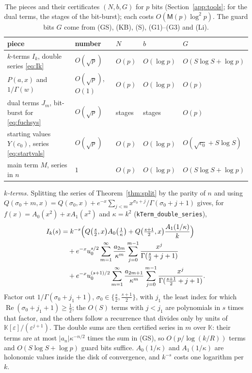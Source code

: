 \documentclass[11pt,reqno]{amsart}
\theoremstyle{definition}
\theoremstyle{remark}
\newcommand{\Mul}{\mathsf{M}}
\begin{document}
\begin{small}
\begin{table}[ht]
\centering\footnotesize
\caption{The pieces and their certificates $(N, b, G)$ for $p$ bits (Section~\ref{app:tools}; for the dual terms, the stages of the bit-burst); each costs $O(\Mul(p)\log^2p)$. The guard bits $G$ come from (GS), (KB), (S), (G1)--(G3) and (Li).}
\label{tab:certificates}
\begin{tabular}{@{}lllll@{}}
\toprule
piece & number & $N$ & $b$ & $G$ \\
\midrule
$k$-terms $I_k$, double series \eqref{eq:Ik} & $O(\sqrt p)$ & $O(p)$ & $O(\log p)$ & $O(S\log S + \log p)$ \\
$P(a, x)$ and $1/\Gamma(w)$ & $O(\sqrt p)$, $O(1)$ & $O(p)$ & $O(\log p)$ & $O(p)$ \\
dual terms $J_m$, bit-burst for \eqref{eq:fuchsys} & $O(\sqrt p)$ & stages & stages & $O(p)$ \\
starting values $Y(c_0)$, series \eqref{eq:startvals} & $O(\sqrt p)$ & $O(p)$ & $O(\log p)$ & $O(\sqrt{c_0} + S\log S)$ \\
main term $M$, series in $n$ & $1$ & $O(p)$ & $O(\log p)$ & $O(S\log S + \log p)$ \\
\bottomrule
\end{tabular}
\end{table}

\emph{$k$-terms.}\label{app:kterms} Splitting the series of Theorem~\ref{thm:split} by the parity of $n$ and using
$Q(\sigma_0+m, x) = Q(\sigma_0, x) + e^{-x}\sum_{j<m}x^{\sigma_0+j}/\Gamma(\sigma_0+j+1)$ gives,
for $f(x) = A_0(x^2) + xA_1(x^2)$ and $\kappa = k^2$ (\nolinkurl{kTerm_double_series}),
\begin{equation}\label{eq:Ik}
\begin{split}
  I_k(s) &= k^{-s}\Bigl(Q\bigl(\tfrac s2, x\bigr)A_0\bigl(\tfrac1\kappa\bigr)
    + Q\bigl(\tfrac{s+1}2, x\bigr)\frac{A_1(1/\kappa)}{k}\Bigr) \\
  &\quad + e^{-x}u_0^{s/2}\sum_{m=1}^{\infty}\frac{a_{2m}}{\kappa^m}\sum_{j=0}^{m-1}\frac{x^j}{\Gamma(\frac s2+j+1)} \\
  &\quad + e^{-x}u_0^{(s+1)/2}\sum_{m=1}^{\infty}\frac{a_{2m+1}}{\kappa^m}\sum_{j=0}^{m-1}\frac{x^j}{\Gamma(\frac{s+1}2+j+1)}.
\end{split}
\end{equation}
Factor out $1/\Gamma(\sigma_0 + j_1 + 1)$, $\sigma_0 \in \{\frac s2, \frac{s+1}2\}$, with $j_1$ the least index for
which $\operatorname{Re}(\sigma_0 + j_1 + 1) \ge \frac12$; the $O(S)$ terms with $j < j_1$ are polynomials in $s$
times that factor, and the others follow a recurrence that divides only by units of
$\mathbb K[\varepsilon]/(\varepsilon^{j+1})$. The double sums are then certified series in $m$ over $\mathbb K$: their
terms are at most $|a_n|\kappa^{-n/2}$ times the sum in (GS), so $O(p/\log(k/R))$ terms and $O(S\log S + \log p)$
guard bits suffice. $A_0(1/\kappa)$ and $A_1(1/\kappa)$ are holonomic values inside the disk of convergence, and
$k^{-s}$ costs one logarithm per $k$.


\end{small}
\end{document}
